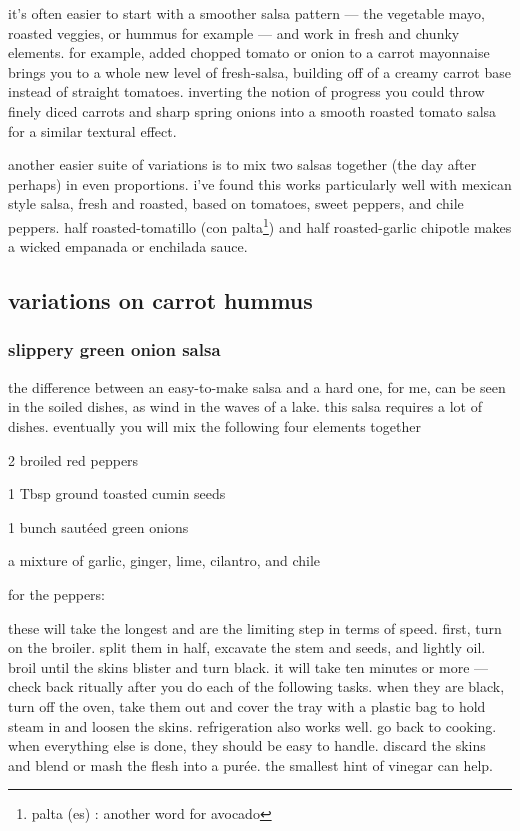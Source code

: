 it's often easier to start with a smoother salsa pattern --- the
vegetable mayo, roasted veggies, or hummus for example --- and work in
fresh and chunky elements. for example, added chopped tomato or onion
to a carrot mayonnaise brings you to a whole new level of fresh-salsa,
building off of a creamy carrot base instead of straight
tomatoes. inverting the notion of progress you could throw finely
diced carrots and sharp spring onions into a smooth roasted tomato
salsa for a similar textural effect.

another easier suite of variations is to mix two salsas together (the
day after perhaps) in even proportions. i've found this works
particularly well with mexican style salsa, fresh and roasted, based
on tomatoes, sweet peppers, and chile peppers. half roasted-tomatillo
(con palta\footnote{palta (es) : another word for avocado}) and half
roasted-garlic chipotle makes a wicked empanada or enchilada sauce.

\subsection{variations on carrot hummus}

\subsubsection{slippery green onion salsa}

the difference between an easy-to-make salsa and a hard one, for me,
can be seen in the soiled dishes, as wind in the waves of a lake. this
salsa requires a lot of dishes. eventually you will mix the following
four elements together

\begin{ingredients}
  \item 2 broiled red peppers
  \item 1 Tbsp ground toasted cumin seeds
  \item 1 bunch saut\'{e}ed green onions
  \item a mixture of garlic, ginger, lime, cilantro, and chile
\end{ingredients}

for the peppers:

these will take the longest and are the limiting step in terms of
speed. first, turn on the broiler. split them in half, excavate the
stem and seeds, and lightly oil. broil until the skins blister and
turn black. it will take ten minutes or more --- check back ritually
after you do each of the following tasks. when they are black, turn
off the oven, take them out and cover the tray with a plastic bag to
hold steam in and loosen the skins. refrigeration also works well. go
back to cooking. when everything else is done, they should be easy to
handle. discard the skins and blend or mash the flesh into a
pur\'{e}e. the smallest hint of vinegar can help.

